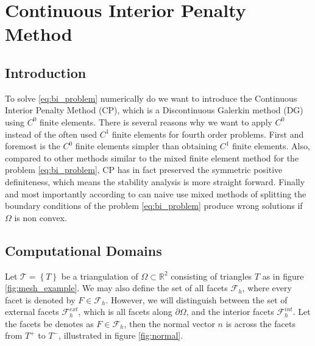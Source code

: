 \newpage
\section{Continuous Interior Penalty Method}%
\label{sec:continious_interior_penalty_method}






\subsection{Introduction}%
\label{sub:introduction}


To solve \eqref{eq:bi_problem} numerically do we want to introduce the Continuous Interior Penalty Method (CP), which is a Discontinuous Galerkin
method (DG) using $C^{0}$ finite elements. There is several reasons why we want to apply $C^{0}$ instead of the often used
$C^{1}$ finite elements for fourth order problems. First and foremost is the $C^0$ finite elements simpler than
obtaining $C^{1}$ finite elements.  Also, compared to other methods similar to the mixed
finite element method for the problem \eqref{eq:bi_problem}, CP has in fact
preserved the symmetric positive definiteness, which means the stability analysis is more straight forward. Finally and most
importantly according to \cite{brenner2012quadratic} can naive use mixed methods of splitting the boundary conditions of
the problem \eqref{eq:bi_problem} produce wrong solutions if $\Omega $ is non convex.





\subsection{Computational Domains}%
\label{sub:computational_domain}

Let $\mathcal{T}  = \left\{ T \right\} $ be a triangulation of $\Omega \subset   \mathbb{R} ^2 $ consisting of triangles $T$ as in figure \ref{fig:mesh_example}. We may also define the set of all facets $\mathcal{F}_{h}$, where every facet is denoted by $F \in \mathcal{F} _{h}$. However, we will distinguish between the
set of external facets $\mathcal{F}^{ext} _{h}$, which is all facets along $\partial \Omega $, and the interior facets $\mathcal{F} ^{int}_{h}$. Let the facets be denotes as $F \in \mathcal{F } _{h}$, then the normal vector $n$ is across the facets from
$T^{+}$ to $T^{-}$, illustrated in figure \ref{fig:normal}.

